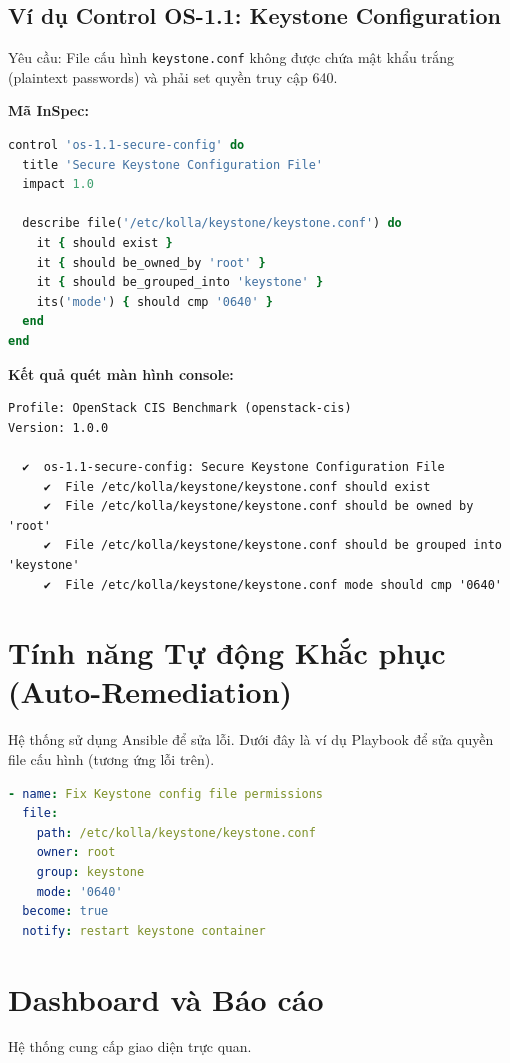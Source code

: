 \documentclass[12pt,a4paper]{report}
\begin{document}
\subsection{Ví dụ Control OS-1.1: Keystone Configuration}
Yêu cầu: File cấu hình \texttt{keystone.conf} không được chứa mật khẩu trắng (plaintext passwords) và phải set quyền truy cập 640.

\textbf{Mã InSpec:}
\begin{lstlisting}[language=Ruby]
control 'os-1.1-secure-config' do
  title 'Secure Keystone Configuration File'
  impact 1.0
  
  describe file('/etc/kolla/keystone/keystone.conf') do
    it { should exist }
    it { should be_owned_by 'root' }
    it { should be_grouped_into 'keystone' }
    its('mode') { should cmp '0640' }
  end
end
\end{lstlisting}

\textbf{Kết quả quét màn hình console:}
\begin{verbatim}
Profile: OpenStack CIS Benchmark (openstack-cis)
Version: 1.0.0

  ✔  os-1.1-secure-config: Secure Keystone Configuration File
     ✔  File /etc/kolla/keystone/keystone.conf should exist
     ✔  File /etc/kolla/keystone/keystone.conf should be owned by 'root'
     ✔  File /etc/kolla/keystone/keystone.conf should be grouped into 'keystone'
     ✔  File /etc/kolla/keystone/keystone.conf mode should cmp '0640'
\end{verbatim}

\section{Tính năng Tự động Khắc phục (Auto-Remediation)}
Hệ thống sử dụng Ansible để sửa lỗi. Dưới đây là ví dụ Playbook để sửa quyền file cấu hình (tương ứng lỗi trên).

\begin{lstlisting}[language=YAML, caption={Ansible Task sửa quyền file}]
- name: Fix Keystone config file permissions
  file:
    path: /etc/kolla/keystone/keystone.conf
    owner: root
    group: keystone
    mode: '0640'
  become: true
  notify: restart keystone container
\end{lstlisting}

\section{Dashboard và Báo cáo}
Hệ thống cung cấp giao diện trực quan.
\end{document}
